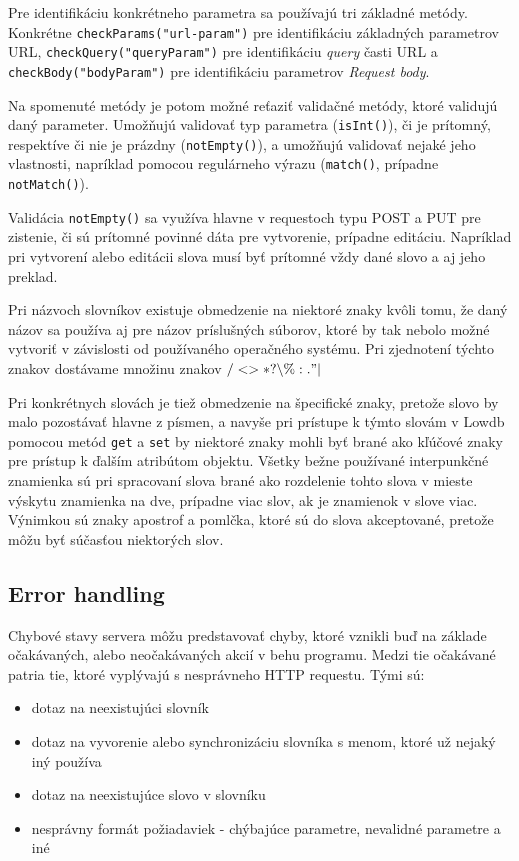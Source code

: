 \documentclass[
  digital, %
  table,   %
  lof,     %
  lot,     %
]{fithesis3}
\begin{document}
Pre identifikáciu konkrétneho parametra sa používajú tri základné metódy. Konkrétne \texttt{checkParams("url-param")} pre identifikáciu základných parametrov URL, \texttt{checkQuery("queryParam")} pre identifikáciu \textit{query} časti URL a \texttt{checkBody("bodyParam")} pre identifikáciu parametrov \textit{Request body}.

Na spomenuté metódy je potom možné reťaziť validačné metódy, ktoré validujú daný parameter. Umožňujú validovať typ parametra (\texttt{isInt()}), či je prítomný, respektíve či nie je prázdny (\texttt{notEmpty()}), a umožňujú validovať nejaké jeho vlastnosti, napríklad pomocou regulárneho výrazu (\texttt{match()}, prípadne \texttt{notMatch()}).

Validácia \texttt{notEmpty()} sa využíva hlavne v requestoch typu POST a PUT pre zistenie, či sú prítomné povinné dáta pre vytvorenie, prípadne editáciu. Napríklad pri vytvorení alebo editácii slova musí byť prítomné vždy dané slovo a aj jeho preklad. 

Pri názvoch slovníkov existuje obmedzenie na niektoré znaky kvôli tomu, že daný názov sa používa aj pre názov príslušných súborov, ktoré by tak nebolo možné vytvoriť v závislosti od používaného operačného systému. Pri zjednotení týchto znakov dostávame množinu znakov $\slash < > * ? \backslash \% : . "  \vert$

Pri konkrétnych slovách je tiež obmedzenie na špecifické znaky, pretože slovo by malo pozostávať hlavne z písmen, a navyše pri prístupe k týmto slovám v Lowdb pomocou metód \texttt{get} a \texttt{set} by niektoré znaky mohli byť brané ako kľúčové znaky pre prístup k ďalším atribútom objektu. Všetky bežne používané interpunkčné znamienka sú pri spracovaní slova brané ako rozdelenie tohto slova v mieste výskytu znamienka na dve, prípadne viac slov, ak je znamienok v slove viac. Výnimkou sú znaky apostrof a pomlčka, ktoré sú do slova akceptované, pretože môžu byť súčasťou niektorých slov. 

\subsection{Error handling}
Chybové stavy servera môžu predstavovať chyby, ktoré vznikli buď na základe očakávaných, alebo neočakávaných akcií v behu programu. Medzi tie očakávané patria tie, ktoré vyplývajú s nesprávneho HTTP requestu. Tými sú:
\begin{itemize}
\item dotaz na neexistujúci slovník
\item dotaz na vyvorenie alebo synchronizáciu slovníka s menom, ktoré už nejaký iný používa
\item dotaz na neexistujúce slovo v slovníku
\item nesprávny formát požiadaviek - chýbajúce parametre, nevalidné parametre a iné
\end{itemize}
\end{document}
